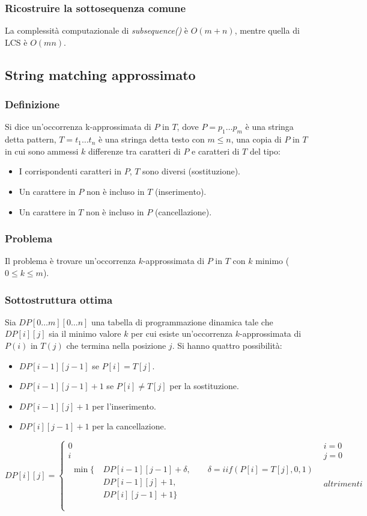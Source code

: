 		\subsubsection{Ricostruire la sottosequenza comune}
			
			La complessit\`a computazionale di \emph{subsequence()} \`e $O(m+n)$, mentre quella di LCS \`e $O(mn)$. 
	\subsection{String matching approssimato}
		\subsubsection{Definizione}
		Si dice un'occorrenza k-approssimata di $P$ in $T$, dove $P=p_1\dots p_m$ \`e una stringa detta pattern, $T=t_1\dots t_n$ \`e una stringa detta testo con $m\le n$, una copia di $P$ in 
		$T$ in cui sono ammessi $k$ differenze tra caratteri di $P$ e caratteri di $T$ del tipo:
		\begin{itemize}
			\item I corrispondenti caratteri in $P$, $T$ sono diversi (sostituzione).
			\item Un carattere in $P$ non \`e incluso in $T$ (inserimento).
			\item Un carattere in $T$ non \`e incluso in $P$ (cancellazione).
		\end{itemize}
		\subsubsection{Problema}
		Il problema \`e trovare un'occorrenza $k$-approssimata di $P$ in $T$ con $k$ minimo ($0\le k \le m$).
		\subsubsection{Sottostruttura ottima}
			Sia $DP[0\dots m][0\dots n]$ una tabella di programmazione dinamica tale che $DP[i][j]$ sia il minimo valore $k$ per cui esiste un'occorrenza $k$-approssimata di $P(i)$ in $T(j)$ che
			termina nella posizione $j$. Si hanno quattro possibilit\`a:
			\begin{itemize}
				\item $DP[i-1][j-1]$ se $P[i]=T[j]$.
				\item $DP[i-1][j-1]+1$ se $P[i]\neq T[j]$ per la sostituzione.
				\item $DP[i-1][j]+1$ per l'inserimento.
				\item $DP[i][j-1]+1$ per la cancellazione.
			\end{itemize}
			$$DP[i][j] =
			\begin{cases}
				0 & i = 0\\
				i & j = 0\\
			\begin{split}
				\min\{\	& DP[i-1][j-1]+\delta, \quad\quad \delta = iif(P[i]=T[j], 0, 1)\\
					& DP[i-1][j]+1, \\
					& DP[i][j-1]+1\} \\
			\end{split}& altrimenti\\
			\end{cases}$$
